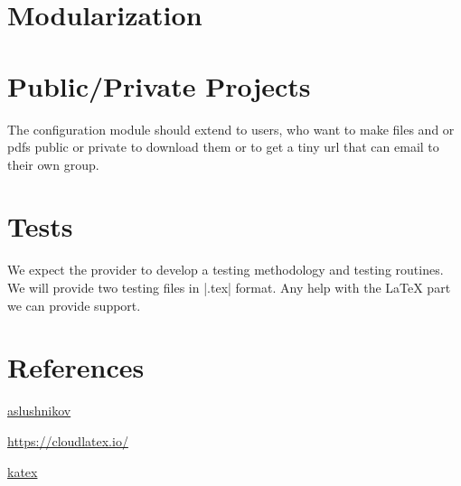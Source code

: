 \section{Modularization}

\section{Public/Private Projects}

The configuration module should extend to users, who want to make files and or pdfs public or private to download them or to get a tiny url that can email to their own group.

\section{Tests}

We expect the provider to develop a testing methodology and testing routines. We will provide two testing files in |.tex| format. Any help with the LaTeX part we can provide support. 

\section{References}

\href{https://github.com/aslushnikov/latex-online#compile-url}{aslushnikov}

\href{cloudlatex}{https://cloudlatex.io/}

\href{https://github.com/Khan/KaTeX}{katex}














